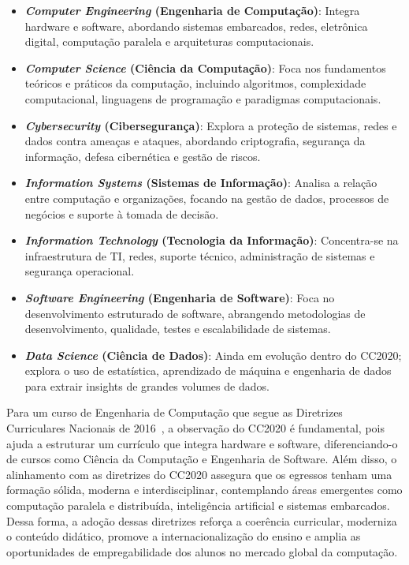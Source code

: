     \begin{itemize}
        \item \textbf{\textit{Computer Engineering} (Engenharia de Computação)}: Integra hardware e software, abordando sistemas embarcados, redes, eletrônica digital, computação paralela e arquiteturas computacionais.
        \item \textbf{\textit{Computer Science} (Ciência da Computação)}: Foca nos fundamentos teóricos e práticos da computação, incluindo algoritmos, complexidade computacional, linguagens de programação e paradigmas computacionais.
        \item \textbf{\textit{Cybersecurity} (Cibersegurança)}: Explora a proteção de sistemas, redes e dados contra ameaças e ataques, abordando criptografia, segurança da informação, defesa cibernética e gestão de riscos.
        \item \textbf{\textit{Information Systems} (Sistemas de Informação)}: Analisa a relação entre computação e organizações, focando na gestão de dados, processos de negócios e suporte à tomada de decisão.
        \item \textbf{\textit{Information Technology} (Tecnologia da Informação)}: Concentra-se na infraestrutura de TI, redes, suporte técnico, administração de sistemas e segurança operacional.
        \item \textbf{\textit{Software Engineering} (Engenharia de Software)}: Foca no desenvolvimento estruturado de software, abrangendo metodologias de desenvolvimento, qualidade, testes e escalabilidade de sistemas.
        \item \textbf{\textit{Data Science} (Ciência de Dados)}: Ainda em evolução dentro do CC2020; explora o uso de estatística, aprendizado de máquina e engenharia de dados para extrair insights de grandes volumes de dados.
    \end{itemize}

Para um curso de Engenharia de Computação que segue as Diretrizes Curriculares Nacionais de 2016~\cite{MEC:CNE:CES:5:2016}, a observação do CC2020 é fundamental, pois ajuda a estruturar um currículo que integra hardware e software, diferenciando-o de cursos como Ciência da Computação e Engenharia de Software. Além disso, o alinhamento com as diretrizes do CC2020 assegura que os egressos tenham uma formação sólida, moderna e interdisciplinar, contemplando áreas emergentes como computação paralela e distribuída, inteligência artificial e sistemas embarcados. Dessa forma, a adoção dessas diretrizes reforça a coerência curricular, moderniza o conteúdo didático, promove a internacionalização do ensino e amplia as oportunidades de empregabilidade dos alunos no mercado global da computação.

